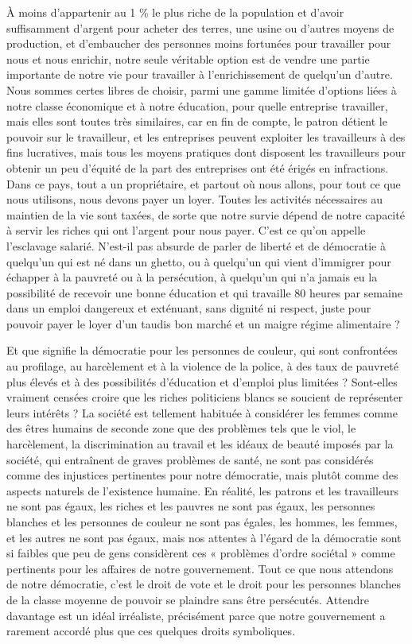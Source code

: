 À moins d'appartenir au 1 \% le plus riche de la population et d'avoir suffisamment d'argent pour acheter des terres, une usine ou d'autres moyens de production, et d'embaucher des personnes moins fortunées pour travailler pour nous et nous enrichir, notre seule véritable option est de vendre une partie importante de notre vie pour travailler à l'enrichissement de quelqu'un d'autre. Nous sommes certes libres de choisir, parmi une gamme limitée d'options liées à notre classe économique et à notre éducation, pour quelle entreprise travailler, mais elles sont toutes très similaires, car en fin de compte, le patron détient le pouvoir sur le travailleur, et les entreprises peuvent exploiter les travailleurs à des fins lucratives, mais tous les moyens pratiques dont disposent les travailleurs pour obtenir un peu d'équité de la part des entreprises ont été érigés en infractions. Dans ce pays, tout a un propriétaire, et partout où nous allons, pour tout ce que nous utilisons, nous devons payer un loyer. Toutes les activités nécessaires au maintien de la vie sont taxées, de sorte que notre survie dépend de notre capacité à servir les riches qui ont l'argent pour nous payer. C'est ce qu'on appelle l'esclavage salarié. N’est-il pas absurde de parler de liberté et de démocratie à quelqu'un qui est né dans un ghetto, ou à quelqu'un qui vient d'immigrer pour échapper à la pauvreté ou à la persécution, à quelqu'un qui n'a jamais eu la possibilité de recevoir une bonne éducation et qui travaille 80 heures par semaine dans un emploi dangereux et exténuant, sans dignité ni respect, juste pour pouvoir payer le loyer d'un taudis bon marché et un maigre régime alimentaire ?

Et que signifie la démocratie pour les personnes de couleur, qui sont confrontées au profilage, au harcèlement et à la violence de la police, à des taux de pauvreté plus élevés et à des possibilités d'éducation et d'emploi plus limitées ? Sont-elles vraiment censées croire que les riches politiciens blancs se soucient de représenter leurs intérêts ? La société est tellement habituée à considérer les femmes comme des êtres humains de seconde zone que des problèmes tels que le viol, le harcèlement, la discrimination au travail et les idéaux de beauté imposés par la société, qui entraînent de graves problèmes de santé, ne sont pas considérés comme des injustices pertinentes pour notre démocratie, mais plutôt comme des aspects naturels de l'existence humaine. En réalité, les patrons et les travailleurs ne sont pas égaux, les riches et les pauvres ne sont pas égaux, les personnes blanches et les personnes de couleur ne sont pas égales, les hommes, les femmes, et les autres ne sont pas égaux, mais nos attentes à l'égard de la démocratie sont si faibles que peu de gens considèrent ces « problèmes d’ordre sociétal » comme pertinents pour les affaires de notre gouvernement. Tout ce que nous attendons de notre démocratie, c'est le droit de vote et le droit pour les personnes blanches de la classe moyenne de pouvoir se plaindre sans être persécutés. Attendre davantage est un idéal irréaliste, précisément parce que notre gouvernement a rarement accordé plus que ces quelques droits symboliques.

